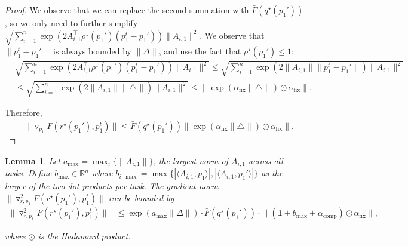 \documentclass[table]{ai2style/ai2}
\newtheorem{lemma}{Lemma}
\newcommand{\R}[0]{\mathbb{R}}
\newcommand{\alphafix}[0]{\alpha_{\text{fix}}}
\newcommand{\alphacomp}[0]{\alpha_{\text{comp}}}
\begin{document}
\begin{proof}
We observe that we can replace the second summation with $\bar{F}(q^\star(p_1'))$, so we only need to further simplify $\sqrt{\sum_{i = 1}^n \exp(2 A_{i, 1}^\top \rho^\star(p_1') (p_1^t - p_1'))  \| A_{i, 1} \|^2}$. We observe that $\|p_1^t - p_1'\|$ is always bounded by $\|\Delta\|$, and use the fact that $\rho^\star(p_1') \le 1$:
\begin{align*}
    & \sqrt{\sum_{i = 1}^n \exp(2 A_{i, 1}^\top \rho^\star(p_1') (p_1^t - p_1'))  \| A_{i, 1} \|^2} \le \sqrt{\sum_{i = 1}^n \exp(2 \|A_{i, 1} \| \|p_1^t - p_1' \|)  \| A_{i, 1} \|^2} \\
    &\le \sqrt{\sum_{i = 1}^n \exp(2 \|A_{i, 1} \| \|\triangle \|)  \| A_{i, 1} \|^2} \le \big\|  \exp( \alphafix \|\triangle \|) \odot \alphafix   \big\|.
\end{align*}

Therefore,
\begin{align*}
    &\|\triangledown_{p_1} F(r^\star(p_1'), p_1^t)\| \le  \bar{F}(q^\star(p_1'))  \big\|  \exp( \alphafix \|\triangle \|) \odot \alphafix  \big\|.
\end{align*}
\end{proof}

\begin{lemma}\label{lemma:grad_r_p_1}
Let $a_{\max} = \max_i \{ \|A_{i, 1}\|\}$, the largest norm of $A_{i, 1}$ across all tasks. Define $b_{\max} \in \R^n$ where $b_{i, \max} = \max\{ |\langle A_{i, 1}, p_1 \rangle|, |\langle A_{i, 1}, p_1' \rangle| \}$ as the larger of the two dot products per task.  The gradient norm $\|\triangledown^2_{r,p_1}F(r^\star(p_1'),p_1^t)\|$ can be bounded by 
    \begin{align*}
\|\triangledown^2_{r,p_1}F(r^\star(p_1'),p_1^t)\| &\le\exp( a_{\max} \| \Delta \| ) \cdot  \bar{F}(q^\star(p_1')) \cdot \big\| (\mathbf{1} + b_{\max} + \alphacomp) \odot \alphafix \big\|,
    \end{align*}
    
where $\odot$ is the Hadamard product.
\end{lemma}
\end{document}
